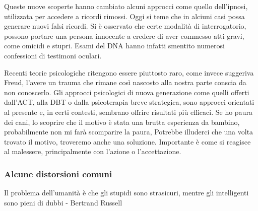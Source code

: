 \documentclass[12pt]{book} %
\begin{document}
Queste nuove scoperte hanno cambiato alcuni approcci come quello dell'ipnosi, utilizzata per accedere a ricordi rimossi.
Oggi si teme che in alciuni casi possa generare nuovi falsi ricordi. Si è osservato che certe modalità di interrogatorio, possono portare una persona innocente a credere di aver commesso atti gravi, come omicidi e stupri. Esami del DNA hanno infatti smentito numerosi confessioni di testimoni oculari.

Recenti teorie psicologiche ritengono essere piuttosto raro, come invece suggeriva Freud, l'avere un trauma che rimane così nascosto alla nostra parte conscia da non conoscerlo. Gli approcci psicologici di nuova generazione come quelli offerti dall’ACT, alla DBT o dalla psicoterapia breve strategica, sono approcci orientati al presente e, in certi contesti, sembrano offrire risultati più efficaci. Se ho paura dei cani, lo scoprire che il motivo è stata una brutta esperienza da bambino, probabilmente non mi farà scomparire la paura, Potrebbe illuderci che una volta trovato il motivo, troveremo anche una soluzione. Importante è come si reagisce al malessere, principalmente con l'azione o l'accettazione.

\subsubsection{Alcune distorsioni comuni}

Il problema dell'umanità è che gli stupidi sono strasicuri, mentre gli intelligenti sono pieni di dubbi - Bertrand Russell
\end{document}
